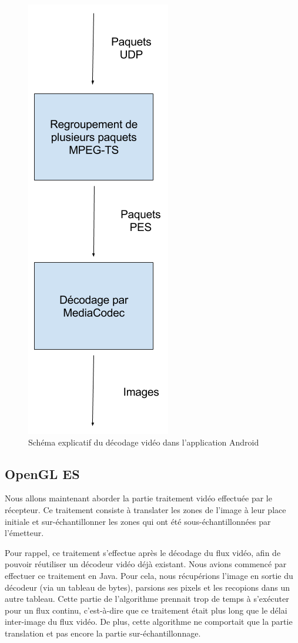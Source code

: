 \documentclass[11pt,a4paper]{article}
\begin{document}
\begin{figure}[H]
\begin{center}
\includegraphics[scale=0.35]{images/decodage_video.png}
\end{center}
\caption{Schéma explicatif du décodage vidéo dans l'application Android}
\label{}
\end{figure}

\subsection{OpenGL ES}
Nous allons maintenant aborder la partie traitement vidéo effectuée par le récepteur.
Ce traitement consiste à translater les zones de l'image à leur place initiale et sur-échantillonner les zones qui ont été sous-échantillonnées par l'émetteur.

\bigbreak
Pour rappel, ce traitement s'effectue après le décodage du flux vidéo, afin de pouvoir réutiliser un décodeur vidéo déjà existant.
Nous avions commencé par effectuer ce traitement en Java. 
Pour cela, nous récupérions l'image en sortie du décodeur (via un tableau de bytes), parsions ses pixels et les recopions dans un autre tableau.
Cette partie de l'algorithme prennait trop de temps à s'exécuter pour un flux continu, c'est-à-dire que ce traitement était plus long que le délai inter-image du flux vidéo.
De plus, cette algorithme ne comportait que la partie translation et pas encore la partie sur-échantillonnage.
\end{document}
